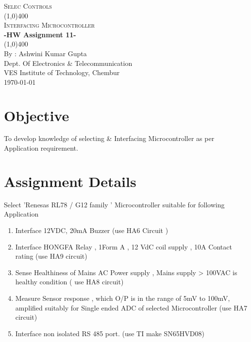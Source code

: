 \documentclass[11pt]{article}
\begin{document}
	
	\begin{titlepage}
		\begin{center}
			\vspace*{1cm}
			\Large{\textsc{Selec Controls}}\\
			\vfill
			\line(1,0){400}\\[1mm]
			\Huge{\textsc{Interfacing Microcontroller}}\\ [3mm]
			\huge{\textbf{-HW Assignment 11-}}\\ [1mm]
			\line(1,0){400}\\
			\vfill 
			\large{By : Ashwini Kumar Gupta\\
			Dept. Of Electronics \& Telecommunication\\
			VES Institute of Technology, Chembur \\}
			\today\\
			
		\end{center}
	\end{titlepage}
	
	\tableofcontents
	\thispagestyle{empty}
	\clearpage
	
	\setcounter{page}{1}
	
	\section{Objective}
		To develop knowledge of selecting \& Interfacing Microcontroller as per
Application requirement.
		
	\section{Assignment Details}
	Select 'Renesas RL78 / G12 family ' Microcontroller suitable for following Application	
		\begin{enumerate}
			\item Interface 12VDC, 20mA Buzzer (use HA6 Circuit )
			\item Interface HONGFA Relay , 1Form A , 12 VdC coil supply , 10A Contact rating (use HA9 circuit)
			\item Sense Healthiness of Mains AC Power supply , Mains supply > 100VAC is healthy condition ( use HA8 circuit)
			\item Measure Sensor response , which O/P is in the range of 5mV to 100mV, amplified suitably for Single ended ADC of selected Microcontroller (use HA7 circuit)
			\item  Interface non isolated RS 485 port. (use TI make SN65HVD08)
		\end{enumerate}
		
\end{document}
